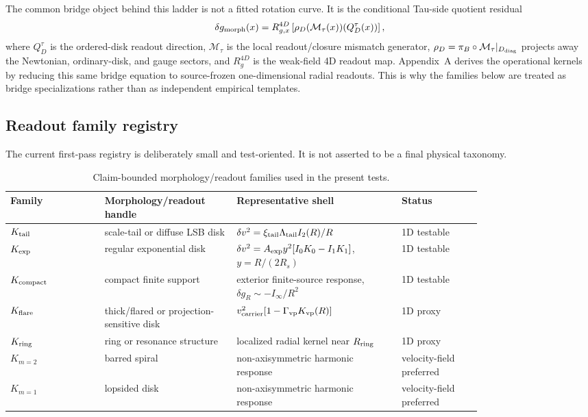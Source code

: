 \documentclass[11pt]{article}
\begin{document}
The common bridge object behind this ladder is not a fitted rotation curve.
It is the conditional Tau-side quotient residual
\[
\delta g_{\rm morph}(x)
=
R^{4D}_{g,x}
\left[
\rho_D(\mathcal M_\tau(x))(Q_D^\tau(x))
\right],
\]
where \(Q_D^\tau\) is the ordered-disk readout direction,
\(\mathcal M_\tau\) is the local readout/closure mismatch generator,
\(\rho_D=\pi_B\circ\mathcal M_\tau|_{D_{\rm diag}}\) projects away the
Newtonian, ordinary-disk, and gauge sectors, and \(R^{4D}_g\) is the weak-field
4D readout map.  Appendix~A derives the operational kernels by reducing this
same bridge equation to source-frozen one-dimensional radial readouts.  This is
why the families below are treated as bridge specializations rather than as
independent empirical templates.

\subsection{Readout family registry}

The current first-pass registry is deliberately small and test-oriented.  It is
not asserted to be a final physical taxonomy.

\begin{table}[H]
\centering
\caption{Claim-bounded morphology/readout families used in the present tests.}
\small
\setlength{\tabcolsep}{4pt}
\begin{tabular}{lp{0.28\linewidth}p{0.35\linewidth}p{0.17\linewidth}}
\toprule
Family & Morphology/readout handle & Representative shell & Status\\
\midrule
\(K_{\rm tail}\) & scale-tail or diffuse LSB disk &
\(\delta v^2=\xi_{\rm tail}\Lambda_{\rm tail}I_2(R)/R\) &
1D testable\\
\(K_{\rm exp}\) & regular exponential disk &
\(\delta v^2=A_{\rm exp}y^2[I_0K_0-I_1K_1]\), \(y=R/(2R_s)\) &
1D testable\\
\(K_{\rm compact}\) & compact finite support &
exterior finite-source response, \(\delta g_R\sim -I_\infty/R^2\) &
1D testable\\
\(K_{\rm flare}\) & thick/flared or projection-sensitive disk &
\(v_{\rm carrier}^2[1-\Gamma_{\rm vp}K_{\rm vp}(R)]\) &
1D proxy\\
\(K_{\rm ring}\) & ring or resonance structure &
localized radial kernel near \(R_{\rm ring}\) &
1D proxy\\
\(K_{m=2}\) & barred spiral &
non-axisymmetric harmonic response &
velocity-field preferred\\
\(K_{m=1}\) & lopsided disk &
non-axisymmetric harmonic response &
velocity-field preferred\\
\bottomrule
\end{tabular}
\end{table}
\end{document}
